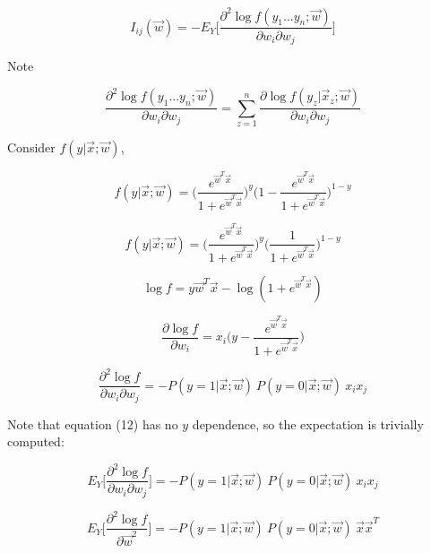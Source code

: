 \documentclass{article}
\begin{document}
\begin{equation}
    I_{ij}(\vec{w}) = -E_Y\Big[\frac{\partial^2\log{f(y_1...y_n; \vec{w})}}{\partial w_i \partial w_j}\Big]
\end{equation}

Note

\begin{equation}
    \frac{\partial^2\log{f(y_1...y_n; \vec{w})}}{\partial w_i \partial w_j} = \sum_{z = 1}^{n}\frac{\partial \log f(y_z|\vec{x}_z;\vec{w})}{\partial w_i \partial w_j}
\end{equation}

Consider $f(y|\vec{x};\vec{w})$,

\begin{equation}
    f(y|\vec{x}; \vec{w}) = \Big(\frac{e^{\vec{w}^T\vec{x}}}{1 + e^{\vec{w}^T\vec{x}}}\Big)^{y} \Big(1 - \frac{e^{\vec{w}^T\vec{x}}}{1 + e^{\vec{w}^T\vec{x}}}\Big)^{1 - y}
\end{equation}

\begin{equation}
    f(y|\vec{x}; \vec{w}) = \Big(\frac{e^{\vec{w}^T\vec{x}}}{1 + e^{\vec{w}^T\vec{x}}}\Big)^{y} \Big(\frac{1}{1 + e^{\vec{w}^T\vec{x}}}\Big)^{1 - y}
\end{equation}

\begin{equation}
    \log f = y\vec{w}^T\vec{x} - \log(1 + e^{\vec{w}^T\vec{x}})
\end{equation}

\begin{equation}
    \frac{\partial \log f}{\partial w_i} = x_i \Big( y - \frac{e^{\vec{w}^T\vec{x}}}{1 + e^{\vec{w}^T\vec{x}}} \Big)
\end{equation}

\begin{equation}
    \frac{\partial^2 \log f}{\partial w_i\partial w_j} = -P(y = 1|\vec{x}; \vec{w})\ P(y = 0|\vec{x}; \vec{w})\ x_ix_j
\end{equation}

Note that equation (12) has no $y$ dependence, so the expectation is trivially computed:

\begin{equation}
    E_Y\Big[\frac{\partial^2 \log f}{\partial w_i\partial w_j}\Big] = -P(y = 1|\vec{x}; \vec{w})\ P(y = 0|\vec{x}; \vec{w})\ x_ix_j
\end{equation}

\begin{equation}
    E_Y\Big[\frac{\partial^2 \log f}{\partial \vec{w}^2}\Big] = -P(y = 1|\vec{x}; \vec{w})\ P(y = 0|\vec{x}; \vec{w})\ \vec{x}\vec{x}^T
\end{equation}
\end{document}
